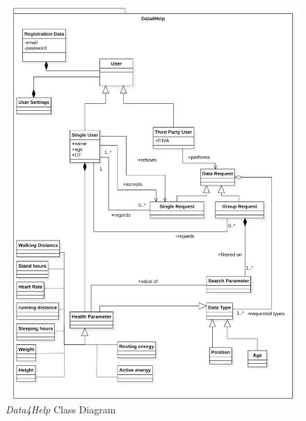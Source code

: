 \documentclass[titlepage]{article}
\begin{document}
		\begin{figure}[H]
			\center
  			\includegraphics[width=\textwidth]{Diagrammi/D4HClass.png}
  			\caption{{\it Data4Help} Class Diagram}
 			\label{fig:D4HClass}
		\end{figure}
\end{document}
